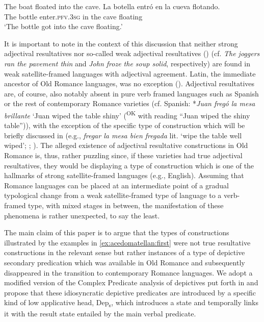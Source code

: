 \documentclass[output=paper,colorlinks,citecolor=brown,
]{langscibook}
\begin{document}
\ea
\settowidth{}
  \ea\label{ex:acedomatellan:sat}
  The boat floated into the cave. 
  \ex\label{ex:acedomatellan:verb}
    \gll La 	botella 	entró							en		la 		cueva 		flotando.	\\
			The	bottle			enter.\textsc{pfv}.\textsc{3sg}		in		the	cave			floating\\
    \glt `The bottle got into the cave floating.’ 
  \z 
\z 

It is important to note in the context of this discussion that neither strong adjectival resultatives nor so-called weak adjectival resultatives (\citealt{Washio1997}) (cf. \textit{The joggers ran the pavement thin} and \textit{John froze the soup solid}, respectively) are found in weak satellite-framed languages with adjectival agreement. Latin, the immediate ancestor of Old Romance languages, was no exception (\citealt{Acedo-Matellan2010, Acedo-Matellan2016}). Adjectival resultatives are, of course, also notably absent in pure verb framed languages such as Spanish or the rest of contemporary Romance varieties (cf. Spanish: *\textit{Juan fregó la mesa brillante} 
`Juan wiped the table shiny’ (\textsuperscript{OK} with reading ``Juan wiped the shiny table'')), with the exception of the specific type of construction which will be briefly discussed in  (e.g., \textit{fregar la mesa bien fregada} lit. `wipe the table well wiped’; \citealt{Armstrong2012}; \citealt{EspinalandMateu2018}). The alleged existence of adjectival resultative constructions in Old Romance is, thus, rather puzzling since, if these varieties had true adjectival resultatives, they would be displaying a type of construction which is one of the hallmarks of strong satellite-framed languages (e.g., English). Assuming that Romance languages can be placed at an intermediate point of a gradual typological change from a weak satellite-framed type of language to a verb-framed type, with mixed stages in between, the manifestation of these phenomena is rather unexpected, to say the least. 

The main claim of this paper is to argue that the types of constructions illustrated by the examples in \ref{ex:acedomatellan:first} were not true resultative constructions in the relevant sense but rather instances of a type of depictive secondary predication which was available in Old Romance and subsequently disappeared in the transition to contemporary Romance languages. We adopt a modified version of the Complex Predicate analysis of depictives put forth in \citet{Pylkkanen2008} and propose that these idiosyncratic depictive predicates are introduced by a specific kind of low applicative head, Dep\textsubscript{s}, which introduces a state and temporally links it with the result state entailed by the main verbal predicate. 
\end{document}

